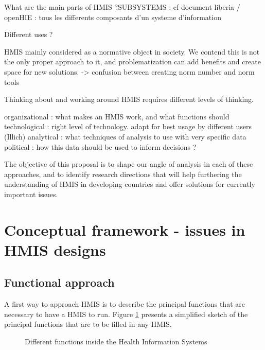 \documentclass[a4paper,11pt,final,twoside]{article}
\begin{document}
What are the main parts of HMIS ?SUBSYSTEMS : cf document liberia / openHIE : tous les differents composants d'un systeme d'information

Different uses ?

HMIS mainly considered as a normative object in society. We contend this is not the only proper approach to it, and problematization can add benefits and create space for new solutions. -> confusion between creating norm number and norm tools


Thinking about and working around HMIS requires different levels of thinking.

organizational : what makes an HMIS work, and what functions should
technological : right level of technology. adapt for best usage by different users (Illich)
analytical : what techniques of analysis to use with very specific data
political : how this data should be used to inform decisions ?

The objective of this proposal is to shape our angle of analysis in each of these approaches, and to identify research directions that will help furthering the understanding of HMIS in developing countries and offer solutions for currently important issues.


\section{Conceptual framework - issues in HMIS designs}

	\subsection{Functional approach}
	\label{sec_function}

A first way to approach HMIS is to describe the principal functions that are necessary to have a HMIS to run. Figure \ref{HMISFunctions} presents a simplified sketch of the principal functions that are to be filled in any HMIS.

\begin{figure}[h]
\begin{center}
\end{center}
\caption{Different functions inside the Health Information Systems}
\label{HMISFunctions}
\end{figure}
\end{document}
